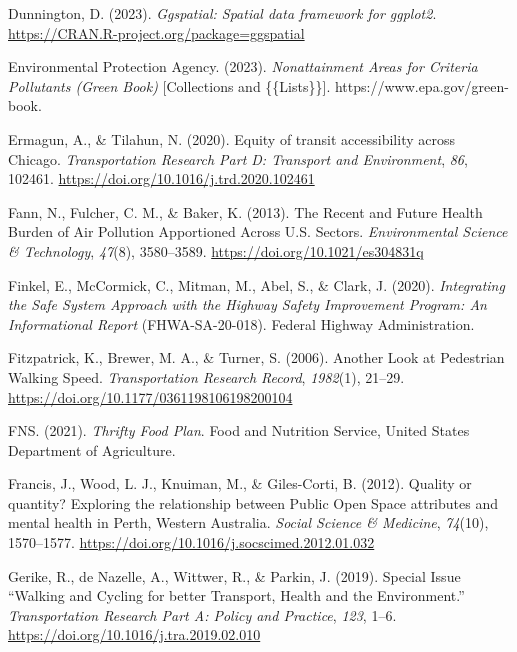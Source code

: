 \documentclass[
  letterpaper,
  authoryear,
  review,
  3p]{elsarticle}
\newlength{\cslhangindent}
\newlength{\cslentryspacingunit} %
\newenvironment{CSLReferences}[2] %
 {%
  \setlength{\parindent}{0pt}
  \ifodd #1
  \let\oldpar\par
  \def\par{\hangindent=\cslhangindent\oldpar}
  \fi
  \setlength{\parskip}{#2\cslentryspacingunit}
 }%
 {}
\begin{document}
\begin{CSLReferences}{1}{0}
\leavevmode{}%
Dunnington, D. (2023). \emph{Ggspatial: Spatial data framework for
ggplot2}. \url{https://CRAN.R-project.org/package=ggspatial}

\leavevmode{}%
Environmental Protection Agency. (2023). \emph{Nonattainment {Areas} for
{Criteria Pollutants} ({Green Book})} {[}Collections and
\{\{Lists\}\}{]}. https://www.epa.gov/green-book.

\leavevmode{}%
Ermagun, A., \& Tilahun, N. (2020). Equity of transit accessibility
across {Chicago}. \emph{Transportation Research Part D: Transport and
Environment}, \emph{86}, 102461.
\url{https://doi.org/10.1016/j.trd.2020.102461}

\leavevmode{}%
Fann, N., Fulcher, C. M., \& Baker, K. (2013). The {Recent} and {Future
Health Burden} of {Air Pollution Apportioned Across U}.{S}. {Sectors}.
\emph{Environmental Science \& Technology}, \emph{47}(8), 3580--3589.
\url{https://doi.org/10.1021/es304831q}

\leavevmode{}%
Finkel, E., McCormick, C., Mitman, M., Abel, S., \& Clark, J. (2020).
\emph{Integrating the {Safe System Approach} with the {Highway Safety
Improvement Program}: {An Informational Report}} (FHWA-SA-20-018).
{Federal Highway Administration}.

\leavevmode{}%
Fitzpatrick, K., Brewer, M. A., \& Turner, S. (2006). Another {Look} at
{Pedestrian Walking Speed}. \emph{Transportation Research Record},
\emph{1982}(1), 21--29.
\url{https://doi.org/10.1177/0361198106198200104}

\leavevmode{}%
FNS. (2021). \emph{Thrifty {Food Plan}}. {Food and Nutrition Service,
United States Department of Agriculture}.

\leavevmode{}%
Francis, J., Wood, L. J., Knuiman, M., \& Giles-Corti, B. (2012).
Quality or quantity? {Exploring} the relationship between {Public Open
Space} attributes and mental health in {Perth}, {Western Australia}.
\emph{Social Science \& Medicine}, \emph{74}(10), 1570--1577.
\url{https://doi.org/10.1016/j.socscimed.2012.01.032}

\leavevmode{}%
Gerike, R., de Nazelle, A., Wittwer, R., \& Parkin, J. (2019). Special
{Issue} {``{Walking} and {Cycling} for better {Transport}, {Health} and
the {Environment}.''} \emph{Transportation Research Part A: Policy and
Practice}, \emph{123}, 1--6.
\url{https://doi.org/10.1016/j.tra.2019.02.010}


\end{CSLReferences}
\end{document}
